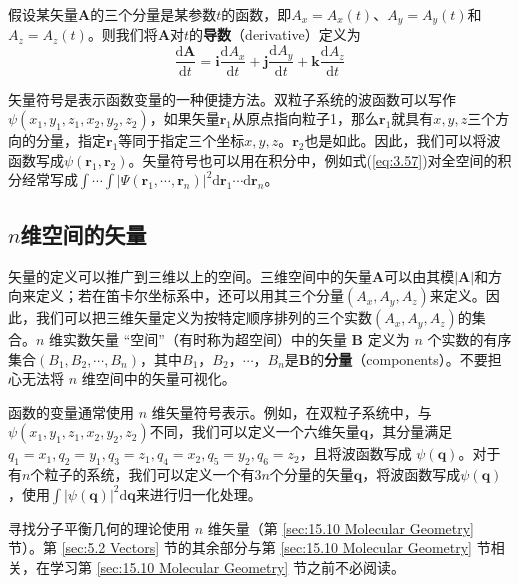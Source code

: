     假设某矢量$\mathbf{A}$的三个分量是某参数$t$的函数，即$A_x = A_x\left(t\right)$、$A_y = A_y\left(t\right)$和$A_z = A_z\left(t\right)$。则我们将$\mathbf{A}$对$t$的\textbf{导数}（derivative）定义为
    \begin{equation}
        \frac{\mathrm{d}\mathbf{A}}{\mathrm{d}t} = \mathbf{i}\frac{\mathrm{d}A_x}{\mathrm{d}t} + \mathbf{j}\frac{\mathrm{d}A_y}{\mathrm{d}t} + \mathbf{k}\frac{\mathrm{d}A_z}{\mathrm{d}t}
        \label{eq:5.32}
    \end{equation}

    矢量符号是表示函数变量的一种便捷方法。双粒子系统的波函数可以写作$\psi\left(x_1,y_1,z_1,x_2,y_2,z_2\right)$，如果矢量$\mathbf{r}_1$从原点指向粒子1，那么$\mathbf{r}_1$就具有$x,y,z$三个方向的分量，指定$\mathbf{r}_1$等同于指定三个坐标$x,y,z$。$\mathbf{r}_2$也是如此。因此，我们可以将波函数写成$\psi\left(\mathbf{r}_1,\mathbf{r}_2\right)$。矢量符号也可以用在积分中，例如式(\ref{eq:3.57})对全空间的积分经常写成$\int \cdots \int\left|\Psi\left(\mathbf{r}_1,\cdots,\mathbf{r}_n\right)\right|^2\mathrm{d}\mathbf{r}_1\cdots\mathrm{d}\mathbf{r}_n$。
    
    
\subsection*{$n$维空间的矢量}

    矢量的定义可以推广到三维以上的空间。三维空间中的矢量$\mathbf{A}$可以由其模$\left|\mathbf{A}\right|$和方向来定义；若在笛卡尔坐标系中，还可以用其三个分量$\left(A_x,A_y,A_z\right)$来定义。因此，我们可以把三维矢量定义为按特定顺序排列的三个实数$\left(A_x,A_y,A_z\right)$的集合。$n$ 维实数矢量 “空间”（有时称为超空间）中的矢量 $\mathbf{B}$ 定义为 $n$ 个实数的有序集合$\left(B_1,B_2,\cdots,B_n\right)$，其中$B_1$，$B_2$，$\cdots$，$B_n$是$\mathbf{B}$的\textbf{分量}（components）。不要担心无法将 $n$ 维空间中的矢量可视化。

    函数的变量通常使用 $n$ 维矢量符号表示。例如，在双粒子系统中，与$\psi\left(x_1,y_1,z_1,x_2,y_2,z_2\right)$不同，我们可以定义一个六维矢量$\mathbf{q}$，其分量满足$q_1=x_1, q_2=y_1, q_3=z_1, q_4=x_2, q_5=y_2, q_6=z_2$，且将波函数写成 $\psi\left(\mathbf{q}\right)$。对于有$n$个粒子的系统，我们可以定义一个有$3n$个分量的矢量$\mathbf{q}$，将波函数写成$\psi\left(\mathbf{q}\right)$，使用$\int\left|\psi\left(\mathbf{q}\right)\right|^2\mathrm{d}\mathbf{q}$来进行归一化处理。

    寻找分子平衡几何的理论使用 $n$ 维矢量（第 \ref{sec:15.10 Molecular Geometry} 节）。第 \ref{sec:5.2 Vectors} 节的其余部分与第 \ref{sec:15.10 Molecular Geometry} 节相关，在学习第 \ref{sec:15.10 Molecular Geometry} 节之前不必阅读。

